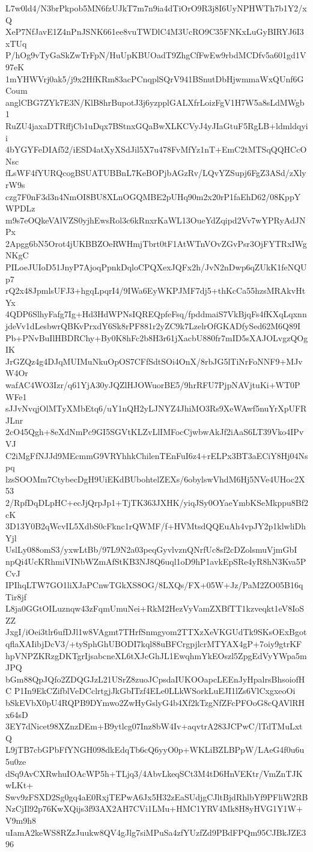 L7w0ld4/N3brPkpob5MN6fzUJkT7m7n9ia4dTiOrO9R3j8I6UyNPHWTh7b1Y2/xQ
XeP7NfJavE1Z4nPnJSNK661ee8vuTWDlC4M3UcRO9C35FNKxLuGyBIRYJ6I3xTUq
P/hOg9vTyGaSkZwTrFpN/HuUpKBUOadT9ZhgCfFwEw9rbdMCDfv5a601gd1V97eK
1mYHWVrj0ak5/j9x2HfKRm83acPCnqplSQrV941BSnutDbHjwmmaWxQUnf6GCoum
anglCBG7ZYk7E3N/KlB8hrBupotJ3j6yzpplGALXfrLoizFgV1H7W5a8sLdMWgb1
RuZU4jaxaDTRffjCb1uDqx7BStnxGQaBwXLKCVyJ4yJIaGtuF5RgLB+ldmldqyii
4bYGYFeDIAf52/iESD4atXyXSdJil5X7u478FvMfYz1nT+EmC2tMTSqQQHCcONsc
fLsWF4fYURQcogBSUATUBBnL7KeBOPjbAGzRv/LQvYZSupj6FgZ3ASd/zXlyrW9s
czg7F0nF3d3n4NmOI8BU8XLnOGQMBE2pUHq90m2x20rP1faEhD62/08KppYWPDLz
m9s7eOQkeVAlVZS0yjhEwsRol3c6kRnxrKaWL13OueYdZqipd2Vv7wYPRyAdJNPx
2Apgg6bN5Orot4jUKBBZOeRWHmjTbrt0tF1AtWTnVOvZGvPsr3OjFYTRxIWgNKgC
PILoeJUIoD51JnyP7AjoqPpnkDqloCPQXexJQFx2h/JvN2nDwp6qZUkK1feNQUp7
rQ2x48JpmlsUFJ3+hgqLpqrI4/9IWa6EyWKPJMF7dj5+thKcCa55hzsMRAkvHtYx
4QDP6SlhyFafg7Ig+Hd3HdWPNsIQREQpfeFsq/fpddmaiS7VkBjqFs4fKXqLqxnn
jdeVv1dLesbwrQBKvPrxdY6Sk8rPF881r2yZC9k7LzelrOfGKADfySed62M6Q89I
Pb+PNvBuIlHBDRChy+By0K8hFc2b8H3r61jXacbU880fr7mID5sXAJOLvgzQOgIK
JrGZQz4g4DJqMUIMuNkuOpOS7CFfSdtSOi4OnX/8rbJG5lTiNrFoNNF9+MJvW4Or
wafAC4WO3Izr/q61YjA30yJQZlHJOWuorBE5/9hrRFU7PjpNAVjtuKi+WT0PWFe1
sJJvNvqjOlMTyXMbEtq6/uY1nQH2yLJNYZ4JhiMO3Rs9XeWAwf5nuYrXpUFRJLnr
2cO45Qgh+8eXdNmPc9GI5SGVtKLZvLlIMFocCjwbwAkJf2iAaS6LT39Vko4IPvVJ
C2iMgFfNJJd9MEcmmG9VRYhhkChilenTEnFuI6z4+rELPx3BT3aECiY8Hj04Nspq
lzsSOOMm7CtybecDgH9UiEKdBUbohtelZEXs/6obylswVhdM6Hj5NVe4UHoc2X53
2/RpfDqDLpHC+ecJjQrpJp1+TjTK363JXHK/yiqJSy0OYaeYmbKSeMkppu8Bf2cK
3D13Y0B2qWcvIL5XdbS0cFknc1rQWMF/f+HVMtsdQQEuAh4vpJY2p1klwliDhYjl
UslLy088omS3/yxwLtBb/97L9N2a03peqGyvlvznQNrfUc8sf2cDZolsmuVjmGbI
npQi4UcKRhmiVINbWZmAfStKB3NJ8Q6uql1oD9hP1avkEpSRe4yR8hN3Kva5PCvJ
IPIhqLTW7GO1liXJaPCnwTGkXS8OG/8LXQs/FX+05W+Jz/PaM2ZO05B16qTir8jf
L8ja0GGtOILuznqw43zFqmUmuNei+RkM2HezVyVamZXBfTT1kzveqkt1eV8IoSZZ
JxgI/iOei3tlr6ufDJl1w8VAgmt7THrfSnmgyom2TTXzXeVKGUdTk9SKsOExBgot
qflaXAIibjDcV3/+tySphGhUBODI7kql88uBFCrgpjlcrMTYAX4gP+7oiy9gtrKF
hpVNPZKRzgDKTgrIjsabcneXL6tXJcGhJL1EwqhmYkEOszl5ZpgEdVyYWpa5mJPQ
bGm88QpJQfo2ZDQGJzL21USrZ8zuoJCpsdaIUKOOapcLEEnJyHpalrsBhsoiofHC
P1In9EkCZifblVeDCclrtgjJkGbITzf4ELe0LLkWSorkLuEJI1lZs6VlCxgxeoOi
bSkEVbX0pU4RQPB9DYmwo2ZwHyGslyG4b4Xf2kTzgNfZFcPFOoG8cQAVlRHx64sD
3EY7dNicet98XZnzDEm+B9ytlcg07Inz8bW4Iv+aqvtrA283JCPwC/lTdTMuLxtQ
L9jTB7cbGPbFfYNGH098dkEdqTb6cQ6yyO0p+WKLiBZLBPpW/LAeG4f0u6u5u0ze
dSq9AvCXRwhuIOAcWP5h+TLjq3/4AbvLkeqSCt3M4tD6HnVEKtr/VmZnTJKwLKt+
Swv9zFSXD2Sg0gq4aE0RxjTEPwA6Jx5H32zEaSUdjgCJltBjdRhlbYf9PFliW2RB
NzCjIl92p76KwXQijs3f93AX2AH7CVi1LMu+HMC1YRV4Mk8H8yHVG1Y1W+V9m9h8
uIamA2keWS8RZzJuukw8QV4gJlg7siMPuSa4zfYUzfZd9PBdFPQm95CJBkJZE396
